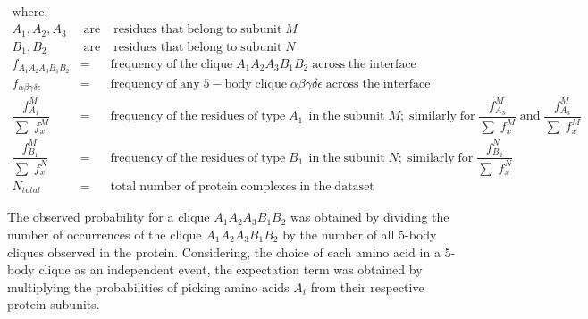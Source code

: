 \begingroup
\setlength\abovedisplayskip{0pt}
\begin{eqnarray}
\mathrm{where,} \nonumber \\
A_{1}, A_{2}, A_{3} &\mathrm{\;are}&\; \mathrm{residues\;that\;belong\;to\;subunit\;}M
\nonumber \\
B_{1}, B_{2} &\mathrm{\;are}&\; \mathrm{residues\;that\;belong\;to\;subunit\;}N
\nonumber \\
f_{A_{1}A_{2}A_{3}B_{1}B_{2}} &=& \mathrm{frequency\;of\;the\;clique\;}A_{1}A_{2}A_{3}B_{1}B_{2}\; \mathrm{across\;the\;interface}
\nonumber \\
f_{\alpha\beta\gamma\delta\epsilon} &=& \mathrm{frequency\;of\;any\;5-body\;clique\;}\alpha\beta\gamma\delta\epsilon \; \mathrm{across\;the\;interface} 
\nonumber \\
\dfrac{f_{A_{1}}^{M}}{\sum\;f_{x}^M} &=& \mathrm{frequency\;of\;the\;residues\;of\;type\;}A_{1}\; \, \mathrm{in\;the\;subunit\;}M; \; \mathrm{similarly\;for\;} \dfrac{f_{A_{3}}^{M}}{\sum\;f_{x}^M} \; \mathrm{and} \; \dfrac{f_{A_{3}}^{M}}{\sum\;f_{x}^M}
\nonumber \\
\dfrac{f_{B_{1}}^{M}}{\sum\;f_{x}^N} &=& \mathrm{frequency\;of\;the\;residues\;of\;type\;}B_{1}\; \, \mathrm{in\;the\;subunit\;}N; \; \mathrm{similarly\;for\;} \dfrac{f_{B_{2}}^{N}}{\sum\;f_{x}^N}
\nonumber \\
N_{total} &=& \mathrm{total\;number\;of\;protein\;complexes\;in\;the\;dataset} \nonumber
\end{eqnarray}
\endgroup

The observed probability for a clique $A_{1}A_{2}A_{3}B_{1}B_{2}$ was obtained by dividing the number of occurrences of the clique $A_{1}A_{2}A_{3}B_{1}B_{2}$ by the number of all 5-body cliques observed in the protein. Considering, the choice of each amino acid in a 5-body clique as an independent event, the expectation term was obtained by multiplying the probabilities of picking amino acids $A_{i}$ from their respective protein subunits.


